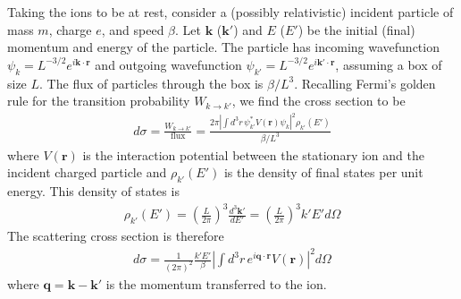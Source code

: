 \documentclass[twocolumn, preprintnumbers,amsmath,amssymb,prd, superscriptaddress]{revtex4}
\begin{document}
\begin{appendices}
Taking the ions to be at rest, consider a (possibly relativistic) incident particle of mass $m$, charge $e$, and speed $\beta$. Let $\textbf{k}$ ($\textbf{k}'$) and $E$ ($E'$) be the initial (final) momentum and energy of the particle.
The particle has incoming wavefunction $\psi_k = L^{-3/2}e^{i \textbf{k}\cdot \textbf{r}}$ and outgoing wavefunction $\psi_{k'} = L^{-3/2}e^{i \textbf{k}'\cdot \textbf{r}}$, assuming a box of size $L$.
The flux of particles through the box is $\beta/L^3$.
Recalling Fermi's golden rule for the transition probability $W_{k\to k'}$, we find the cross section to be
\begin{align}
  \label{eq:DifferentialBornCrossSection}
d\sigma = \frac{W_{k\to k'}}{\text{flux}} = \frac{2 \pi|\int d^3r \, \psi_{k'}^* V(\textbf{r})\psi_k|^2 \rho_{k'}(E')}{\beta/L^3}
\end{align}
where $V(\textbf{r})$ is the interaction potential between the stationary ion and the incident charged particle and $\rho_{k'}(E')$ is the density of final states per unit energy.
This density of states is
\begin{align}
\rho_{k'}(E') = \left( \frac{L}{2 \pi} \right)^3 \frac{d^3 \textbf{k}'}{dE'}
  = \left( \frac{L}{2 \pi} \right)^3 k' E' d \Omega
\end{align}
The scattering cross section is therefore
\begin{align}
d\sigma = \frac{1}{(2 \pi)^2} \frac{k'E'}{\beta} \left|\int d^3r \, e^{i\textbf{q}\cdot \textbf{r}}V(\textbf{r})\right|^2 d \Omega
\end{align}
where $\textbf{q} = \textbf{k} - \textbf{k}'$ is the momentum transferred to the ion.


\end{appendices}
\end{document}
